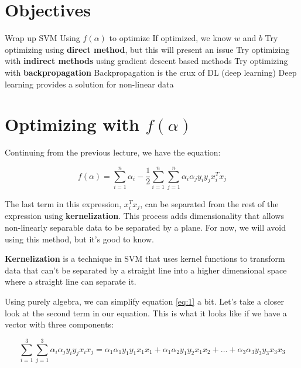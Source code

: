 
\section*{Objectives}
\begin{outline}
    \1 Wrap up SVM
    \1 Using $f(\alpha)$ to optimize
        \2 If optimized, we know $w$ and $b$
    \1 Try optimizing using \textbf{direct method}, but this will present an issue
    \1 Try optimizing with \textbf{indirect methods} using gradient descent based methods
    \1 Try optimizing with \textbf{backpropagation}
        \2 Backpropagation is the crux of DL (deep learning)
        \2 Deep learning provides a solution for non-linear data 

\end{outline}

\section*{Optimizing with $f(\alpha)$}

Continuing from the previous lecture, we have the equation:

\begin{equation} \label{eq:1}
f(\alpha) = \sum\limits_{i=1}^{n} \alpha_i - \frac{1}{2} \sum\limits_{i=1}^{n} \sum\limits_{j=1}^{n} \alpha_i \alpha_j y_i y_j x_i^T x_j
\end{equation}

The last term in this expression, $x_i^T x_j$, can be separated from the rest of the expression using \textbf{kernelization}. This process adds dimensionality that allows non-linearly separable data to be separated by a plane. For now, we will avoid using this method, but it's good to know.

\textbf{Kernelization} is a technique in SVM that uses kernel functions to transform data that can't be separated by a straight line into a higher dimensional space where a straight line can separate it.

Using purely algebra, we can simplify equation \ref{eq:1} a bit. Let's take a closer look at the second term in our equation. This is what it looks like if we have a vector with three components:

\[
\sum\limits_{i=1}^{3} \sum\limits_{j=1}^{3} \alpha_i \alpha_j y_i y_j x_i x_j = \alpha_1\alpha_1y_1y_1x_1x_1 + \alpha_1\alpha_2y_1y_2x_1x_2 + ... + \alpha_3\alpha_3y_3y_3x_3x_3
\]

